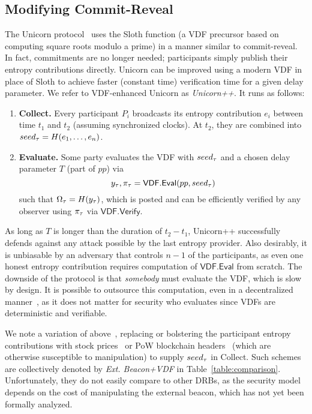 \subsection{Modifying Commit-Reveal}
\label{subsection:modifying-commit-reveal}
The Unicorn protocol~\cite{lenstra2015random} uses the Sloth function (a VDF precursor based on computing square roots modulo a prime) in a manner similar to commit-reveal. In fact, commitments are no longer needed; participants simply publish their entropy contributions directly. Unicorn can be improved using a modern VDF in place of Sloth to achieve faster (constant time) verification time for a given delay parameter. We refer to VDF-enhanced Unicorn as \textit{Unicorn++}. It runs as follows:
\begin{enumerate}
    \item \textbf{Collect.} Every participant $P_i$ broadcasts its entropy contribution $e_i$ between time $t_1$ and $t_2$ (assuming synchronized clocks). At $t_2$, they are combined into $seed_\tau = H(e_1,\ldots, e_n)$.
    \item \textbf{Evaluate.} Some party evaluates the VDF with $seed_\tau$ and a chosen delay parameter $T$ (part of $pp$) via
    $$y_\tau, \pi_\tau = \mathsf{VDF.Eval}(pp, seed_\tau)$$
    such that $\Omega_\tau = H(y_\tau)$, which is posted and can be efficiently verified by any observer using $\pi_\tau$ via $\mathsf{VDF.Verify}$.
\end{enumerate}
As long as $T$ is longer than the duration of $t_2 - t_1$, Unicorn++ successfully defends against any attack possible by the last entropy provider. Also desirably, it is unbiasable by an adversary that controls $n - 1$ of the participants, as even one honest entropy contribution requires computation of $\mathsf{VDF.Eval}$ from scratch. The downside of the protocol is that \emph{somebody} must evaluate the VDF, which is slow by design. It is possible to outsource this computation, even in a decentralized manner~\cite{thyagarajan2021opensquare}, as it does not matter for security who evaluates since VDFs are deterministic and verifiable. %

We note a variation of above~\cite{bunz2017proofs, bonneau2015bitcoin}, replacing or bolstering the participant entropy contributions with  stock prices~\cite{clark2010use} or PoW blockchain headers~\cite{nakamoto2008bitcoin, bentov2016bitcoin, han2020randchain} (which are otherwise susceptible to manipulation) to supply $seed_\tau$ in Collect. Such schemes are collectively denoted by \textit{Ext. Beacon+VDF} in Table~\ref{table:comparison}.
Unfortunately, they do not easily compare to other DRBs, as the security model depends on the cost of manipulating the external beacon, which has not yet been formally analyzed.

